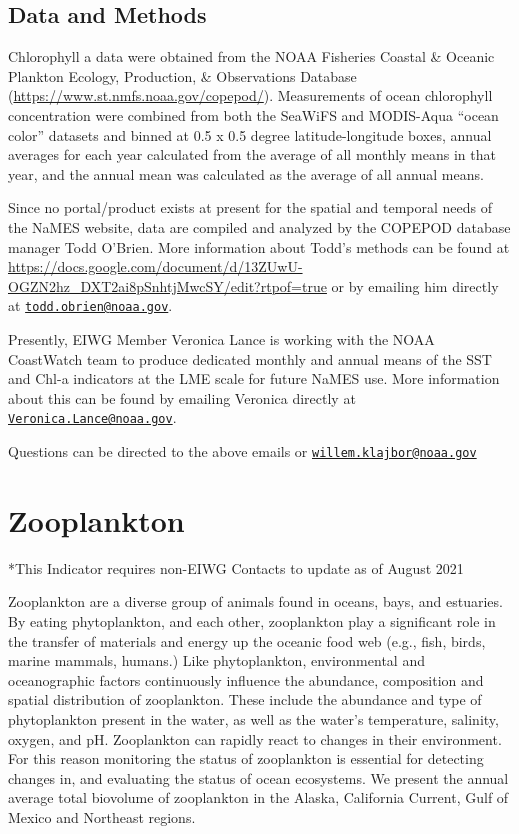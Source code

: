 \documentclass[
]{book}
\begin{document}
\hypertarget{data-and-methods}{%
\section{Data and Methods}\label{data-and-methods}}

Chlorophyll a data were obtained from the NOAA Fisheries Coastal \& Oceanic Plankton Ecology, Production, \& Observations Database (\url{https://www.st.nmfs.noaa.gov/copepod/}). Measurements of ocean chlorophyll concentration were combined from both the SeaWiFS and MODIS-Aqua ``ocean color'' datasets and binned at 0.5 x 0.5 degree latitude-longitude boxes, annual averages for each year calculated from the average of all monthly means in that year, and the annual mean was calculated as the average of all annual means.

Since no portal/product exists at present for the spatial and temporal needs of the NaMES website, data are compiled and analyzed by the COPEPOD database manager Todd O'Brien. More information about Todd's methods can be found at \url{https://docs.google.com/document/d/13ZUwU-OGZN2hz_DXT2ai8pSnhtjMwcSY/edit?rtpof=true} or by emailing him directly at \href{mailto:todd.obrien@noaa.gov}{\nolinkurl{todd.obrien@noaa.gov}}.

Presently, EIWG Member Veronica Lance is working with the NOAA CoastWatch team to produce dedicated monthly and annual means of the SST and Chl-a indicators at the LME scale for future NaMES use. More information about this can be found by emailing Veronica directly at \href{mailto:Veronica.Lance@noaa.gov}{\nolinkurl{Veronica.Lance@noaa.gov}}.

Questions can be directed to the above emails or \href{mailto:willem.klajbor@noaa.gov}{\nolinkurl{willem.klajbor@noaa.gov}}

\hypertarget{zooplankton}{%
\chapter{Zooplankton}\label{zooplankton}}

*This Indicator requires non-EIWG Contacts to update as of August 2021

Zooplankton are a diverse group of animals found in oceans, bays, and estuaries. By eating phytoplankton, and each other, zooplankton play a significant role in the transfer of materials and energy up the oceanic food web (e.g., fish, birds, marine mammals, humans.) Like phytoplankton, environmental and oceanographic factors continuously influence the abundance, composition and spatial distribution of zooplankton. These include the abundance and type of phytoplankton present in the water, as well as the water's temperature, salinity, oxygen, and pH. Zooplankton can rapidly react to changes in their environment. For this reason monitoring the status of zooplankton is essential for detecting changes in, and evaluating the status of ocean ecosystems. We present the annual average total biovolume of zooplankton in the Alaska, California Current, Gulf of Mexico and Northeast regions.
\end{document}
